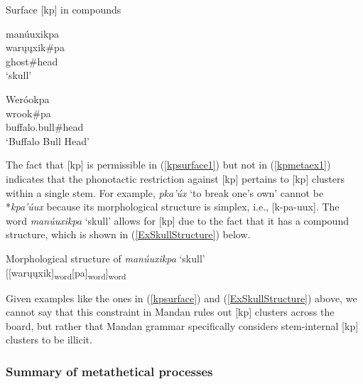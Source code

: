 \begin{exe}
\item\label{kpsurface} Surface [kp] in compounds

\begin{xlist}

\item\label{kpsurface1} \glll manúuxikpa\\
warųųxik\#pa\\
\textnormal{ghost}\#\textnormal{head}\\
\glt `skull' \citep[7]{hollow1973b}

\item\label{kpsurface2} \glll Weróokpa\\
wrook\#pa\\
\textnormal{buffalo.bull}\#\textnormal{head}\\
\glt `Buffalo Bull Head' \citep[xviii]{densmore1923}

\end{xlist}

\end{exe}

\largerpage
The fact that [kp] is permissible in (\ref{kpsurface1}) but not in (\ref{kpmetaex1}) indicates that the phonotactic restriction against [kp] pertains to [kp] clusters within a single stem. For example, \textit{pka'úx} `to break one's own' cannot be *\textit{kpa'úux} because its morphological structure is simplex, i.e., [k-pa-uux]. The word \textit{manúuxikpa} `skull' allows for [kp] due to the fact that it has a compound structure, which is shown in (\ref{ExSkullStructure}) below.

\begin{exe}
\item\label{ExSkullStructure} Morphological structure of \textit{manúuxikpa} `skull'\\
{[}[warųųxik]\textsubscript{word}[pa]\textsubscript{word}]\textsubscript{word}
\end{exe}

Given examples like the ones in (\ref{kpsurface}) and (\ref{ExSkullStructure}) above, we cannot say that this constraint in Mandan rules out [kp] clusters across the board, but rather that Mandan grammar specifically considers stem-internal [kp] clusters to be illicit.

\subsubsection{Summary of metathetical processes}\label{metathesissummary}

